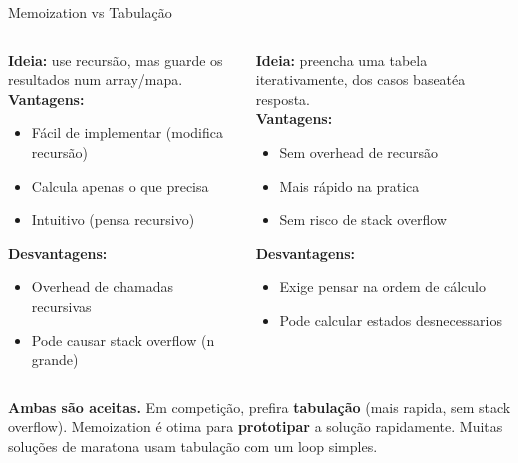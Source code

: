 \documentclass[aspectratio=169,10pt]{beamer}
\begin{document}
\begin{frame}{Memoization vs Tabulação}
  \begin{columns}[t]
      \begin{tcolorbox}[caixaDP,title={Memoization (Top-Down)}]
        \footnotesize
        \textbf{Ideia:} use recursão, mas guarde os
        resultados num array/mapa.\\[3pt]
        \textbf{Vantagens:}
        \begin{itemize}\footnotesize
          \item Fácil de implementar (modifica recursão)
          \item Calcula apenas o que precisa
          \item Intuitivo (pensa recursivo)
        \end{itemize}
        \textbf{Desvantagens:}
        \begin{itemize}\footnotesize
          \item Overhead de chamadas recursivas
          \item Pode causar stack overflow (n grande)
        \end{itemize}
      \end{tcolorbox}
      \begin{tcolorbox}[caixaTeal,title={Tabulação (Bottom-Up)}]
        \footnotesize
        \textbf{Ideia:} preencha uma tabela iterativamente,
        dos casos baseatéa resposta.\\[3pt]
        \textbf{Vantagens:}
        \begin{itemize}\footnotesize
          \item Sem overhead de recursão
          \item Mais rápido na pratica
          \item Sem risco de stack overflow
        \end{itemize}
        \textbf{Desvantagens:}
        \begin{itemize}\footnotesize
          \item Exige pensar na ordem de cálculo
          \item Pode calcular estados desnecessarios
        \end{itemize}
      \end{tcolorbox}
  \end{columns}
  \vspace{0.10cm}
  \begin{tcolorbox}[caixaAmarelo,title={Qual usar na OBI?}]
    \footnotesize
    \textbf{Ambas são aceitas.}
    Em competição, prefira \textbf{tabulação} (mais rapida, sem stack overflow).
    Memoization é otima para \textbf{prototipar} a solução rapidamente.
    Muitas soluções de maratona usam tabulação com um loop simples.
  \end{tcolorbox}
\end{frame}
\end{document}
